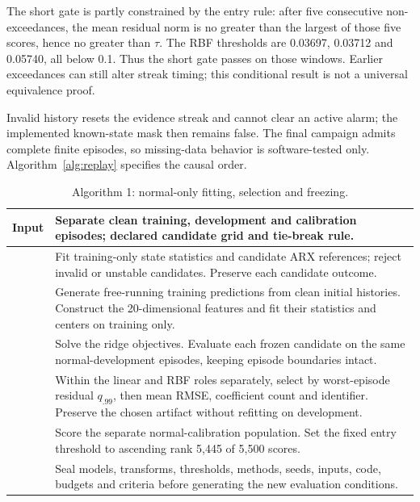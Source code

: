 The short gate is partly constrained by the entry rule: after five consecutive non-exceedances, the mean residual norm is no greater than the largest of those five scores, hence no greater than $\tau$. The RBF thresholds are 0.03697, 0.03712 and 0.05740, all below 0.1. Thus the short gate passes on those windows. Earlier exceedances can still alter streak timing; this conditional result is not a universal equivalence proof.

Invalid history resets the evidence streak and cannot clear an active alarm; the implemented known-state mask then remains false. The final campaign admits complete finite episodes, so missing-data behavior is software-tested only. Algorithm~\ref{alg:replay} specifies the causal order.

\begin{table}[t]\centering
\caption{Algorithm 1: normal-only fitting, selection and freezing.}
\label{alg:fit}
\begin{tabular}{>{\raggedright\arraybackslash}p{}>{\raggedright\arraybackslash}p{}}\toprule
Input & Separate clean training, development and calibration episodes; declared candidate grid and tie-break rule.\\\midrule
1 & Fit training-only state statistics and candidate ARX references; reject invalid or unstable candidates. Preserve each candidate outcome.\\
2 & Generate free-running training predictions from clean initial histories. Construct the 20-dimensional features and fit their statistics and centers on training only.\\
3 & Solve the ridge objectives. Evaluate each frozen candidate on the same normal-development episodes, keeping episode boundaries intact.\\
4 & Within the linear and RBF roles separately, select by worst-episode residual $q_{.99}$, then mean RMSE, coefficient count and identifier. Preserve the chosen artifact without refitting on development.\\
5 & Score the separate normal-calibration population. Set the fixed entry threshold to ascending rank 5,445 of 5,500 scores.\\
6 & Seal models, transforms, thresholds, methods, seeds, inputs, code, budgets and criteria before generating the new evaluation conditions.\\\bottomrule
\end{tabular}
\end{table}

